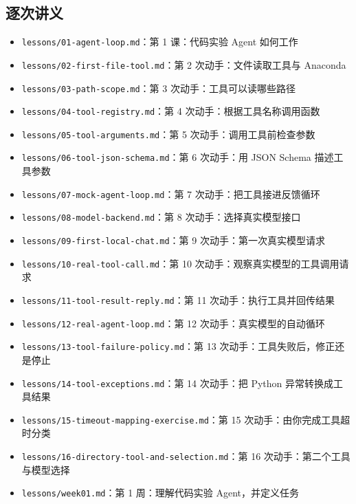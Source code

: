 \documentclass[UTF8,zihao=-4,fontset=fandol]{ctexart}
\begin{document}
\subsection{逐次讲义}
\begin{itemize}
\item \nolinkurl{lessons/01-agent-loop.md}：第 1 课：代码实验 Agent 如何工作
\item \nolinkurl{lessons/02-first-file-tool.md}：第 2 次动手：文件读取工具与 Anaconda
\item \nolinkurl{lessons/03-path-scope.md}：第 3 次动手：工具可以读哪些路径
\item \nolinkurl{lessons/04-tool-registry.md}：第 4 次动手：根据工具名称调用函数
\item \nolinkurl{lessons/05-tool-arguments.md}：第 5 次动手：调用工具前检查参数
\item \nolinkurl{lessons/06-tool-json-schema.md}：第 6 次动手：用 JSON Schema 描述工具参数
\item \nolinkurl{lessons/07-mock-agent-loop.md}：第 7 次动手：把工具接进反馈循环
\item \nolinkurl{lessons/08-model-backend.md}：第 8 次动手：选择真实模型接口
\item \nolinkurl{lessons/09-first-local-chat.md}：第 9 次动手：第一次真实模型请求
\item \nolinkurl{lessons/10-real-tool-call.md}：第 10 次动手：观察真实模型的工具调用请求
\item \nolinkurl{lessons/11-tool-result-reply.md}：第 11 次动手：执行工具并回传结果
\item \nolinkurl{lessons/12-real-agent-loop.md}：第 12 次动手：真实模型的自动循环
\item \nolinkurl{lessons/13-tool-failure-policy.md}：第 13 次动手：工具失败后，修正还是停止
\item \nolinkurl{lessons/14-tool-exceptions.md}：第 14 次动手：把 Python 异常转换成工具结果
\item \nolinkurl{lessons/15-timeout-mapping-exercise.md}：第 15 次动手：由你完成工具超时分类
\item \nolinkurl{lessons/16-directory-tool-and-selection.md}：第 16 次动手：第二个工具与模型选择
\item \nolinkurl{lessons/week01.md}：第 1 周：理解代码实验 Agent，并定义任务
\end{itemize}
\end{document}
